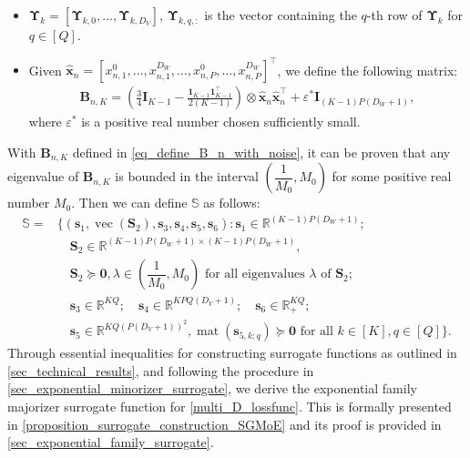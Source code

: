 \documentclass{article}
\newcommand{\zero}{\ensuremath{\mathbf{0}}}
\DeclareMathOperator*{\vect}{vec} %
\DeclareMathOperator*{\mat}{mat}
\def\vs{{\bm{s}}}
\def\vx{{\bm{x}}}
\def\evx{{x}}
\def\mB{{\bm{B}}}
\def\mI{{\bm{I}}}
\def\mS{{\bm{S}}}
\def\mUpsilon{{\bm{\Upsilon}}}
\def\sR{{\mathbb{R}}}
\begin{document}
\begin{itemize}
    \item $\mUpsilon_k=\left[\mUpsilon_{k,0},\dots,\mUpsilon_{k,D_V}\right]$, $\mUpsilon_{k,q,:}$ is the vector containing the $q$-th row of $\mUpsilon_k$ for $q\in[Q]$.
  
    \item Given $\hat{\vx}_n=\left[\evx_{n,1}^{0},\dots,\evx_{n,1}^{D_W},\dots,\evx_{n,P}^{0},\dots,\evx_{n,P}^{D_W}\right]^{\top}$, we define the following matrix:
    \begin{align}\label{eq_define_B_n_with_noise}
    \mB_{n,K}=\left(\frac{3}{4}\mI_{K-1}-\frac{\bm{1}_{K-1}\bm{1}_{K-1}^{\top}}{2(K-1)}\right)\otimes\hat{\vx}_n\hat{\vx}_n^{\top}+\varepsilon^*\mI_{(K-1)P(D_W+1)},
   \end{align}
   where $\varepsilon^*$ is a positive real number chosen sufficiently small. 
    
\end{itemize}
With $\mB_{n,K}$ defined in \cref{eq_define_B_n_with_noise}, it can be proven that any eigenvalue of $\mB_{n,K}$ is bounded in the interval $\left(\dfrac{1}{M_0},M_0\right)$ for some positive real number $M_0$. Then we can define $\mathbb{S}$ as follows:
\begin{align}\label{eq_define_S2_main}
    \mathbb{S}=&\big\{(\vs_1, \vect(\mS_2),\vs_3, \vs_4, \vs_5, \vs_6):  \vs_1\in \sR^{(K-1)P(D_W+1)};\nonumber\\
    &\quad \mS_2\in \sR^{(K-1)P(D_W+1)\times (K-1)P(D_W+1)},\nonumber\\ 
    &\quad \mS_2 \succeq \zero, \lambda \in \left(\dfrac{1}{M_0},M_0\right) \text{ for all eigenvalues $\lambda$ of } \mS_2;\nonumber\\
    &\quad \vs_3 \in \sR^{KQ}; \quad \vs_4\in \sR^{KPQ(D_V+1)}; \quad \vs_6\in\sR_{+}^{KQ};\nonumber\\
    &\quad \vs_5\in \sR^{KQ(P(D_V+1))^2}, \mat(\vs_{5,k:q}) \succeq \zero \text{ for all $k\in[K],q\in [Q]$}\big\}.
\end{align}
Through essential inequalities for constructing surrogate functions as outlined in \cref{sec_technical_results}, and following the procedure in \cref{sec_exponential_minorizer_surrogate}, we derive the exponential family majorizer surrogate function for \cref{multi_D_lossfunc}. This is formally presented in \cref{proposition_surrogate_construction_SGMoE} and its proof is provided in \cref{sec_exponential_family_surrogate}.
\end{document}
